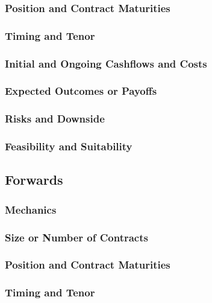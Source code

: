 \documentclass[11pt, a4paper, british]{article}
\begin{document}
\subsubsection{Position and Contract Maturities}

\subsubsection{Timing and Tenor}

\subsubsection{Initial and Ongoing Cashflows and Costs}

\subsubsection{Expected Outcomes or Payoffs}

\subsubsection{Risks and Downside}

\subsubsection{Feasibility and Suitability}

\newpage

\subsection{Forwards}

\subsubsection{Mechanics}

\subsubsection{Size or Number of Contracts}

\subsubsection{Position and Contract Maturities}

\subsubsection{Timing and Tenor}
\end{document}
